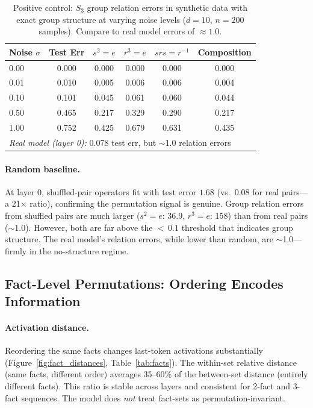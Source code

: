 \documentclass[10pt, letterpaper]{article}
\begin{document}
\begin{table}[t]
\centering
\caption{Positive control: $S_3$ group relation errors in synthetic data with exact group structure at varying noise levels ($d = 10$, $n = 200$ samples). Compare to real model errors of $\approx 1.0$.}
\label{tab:positive}
\small
\begin{tabular}{@{}lccccc@{}}
\toprule
Noise $\sigma$ & Test Err & $s^2\!=\!e$ & $r^3\!=\!e$ & $srs\!=\!r^{-1}$ & Composition \\
\midrule
0.00 & 0.000 & 0.000 & 0.000 & 0.000 & 0.000 \\
0.01 & 0.010 & 0.005 & 0.006 & 0.006 & 0.004 \\
0.10 & 0.101 & 0.045 & 0.061 & 0.060 & 0.044 \\
0.50 & 0.465 & 0.217 & 0.329 & 0.290 & 0.217 \\
1.00 & 0.752 & 0.425 & 0.679 & 0.631 & 0.435 \\
\midrule
\multicolumn{6}{l}{\textit{Real model (layer 0):} 0.078 test err, but $\sim$1.0 relation errors} \\
\bottomrule
\end{tabular}
\end{table}

\paragraph{Random baseline.} At layer 0, shuffled-pair operators fit with test error $1.68$ (vs.\ $0.08$ for real pairs---a 21$\times$ ratio), confirming the permutation signal is genuine. Group relation errors from shuffled pairs are much larger ($s^2 = e$: 36.9, $r^3 = e$: 158) than from real pairs ($\sim$1.0). However, both are far above the ${<}\,0.1$ threshold that indicates group structure. The real model's relation errors, while lower than random, are $\sim$1.0---firmly in the no-structure regime.

\subsection{Fact-Level Permutations: Ordering Encodes Information}

\paragraph{Activation distance.} Reordering the same facts changes last-token activations substantially (Figure~\ref{fig:fact_distances}, Table~\ref{tab:facts}). The within-set relative distance (same facts, different order) averages 35--60\% of the between-set distance (entirely different facts). This ratio is stable across layers and consistent for 2-fact and 3-fact sequences. The model does \emph{not} treat fact-sets as permutation-invariant.
\end{document}
